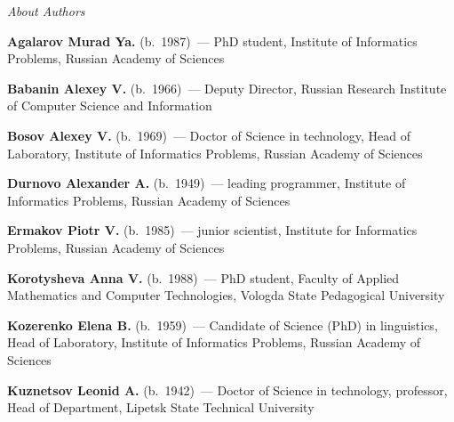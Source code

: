 \begin{center}\LARGE
\textit{About Authors}
\end{center}

\thispagestyle{empty}

\vspace*{48pt}

\begin{multicols}{2}


\noindent
\textbf{Agalarov Murad Ya.} (b.\ 1987)~--- PhD student, 
Institute of Informatics Problems, Russian Academy of Sciences

\vspace*{3pt}


\noindent
\textbf{Babanin Alexey V.} (b.\ 1966)~--- Deputy Director, 
Russian Research Institute of Computer Science and Information

\vspace*{3pt}

\noindent
\textbf{Bosov Alexey V.} (b.\ 1969)~--- Doctor of Science in technology, Head of
Laboratory, Institute of Informatics Problems, Russian Academy of Sciences

\vspace*{3pt}

\noindent
\textbf{Durnovo Alexander A.} (b.\ 1949)~--- leading programmer, 
Institute of Informatics Problems, Russian Academy of Sciences


\vspace*{3pt}

\noindent
\textbf{Ermakov Piotr V.} (b.\ 1985)~--- 
junior scientist, Institute for Informatics Problems, Russian Academy of Sciences

\vspace*{3pt}

\noindent
\textbf{Korotysheva Anna V.} (b.\ 1988)~--- PhD student, Faculty of Applied
Mathematics and Computer Technologies, Vologda State Pedagogical University

\vspace*{3pt}


\noindent 
\textbf{Kozerenko Elena B.} (b.\ 1959)~--- Candidate of Science (PhD) in linguistics, 
Head of Laboratory, Institute of Informatics Problems, Russian Academy of Sciences

\vspace*{3pt}

\noindent 
\textbf{Kuznetsov Leonid A.} (b.\ 1942)~--- Doctor of Science in technology, 
professor, Head of Department,  Lipetsk State Technical University


\end{multicols}
